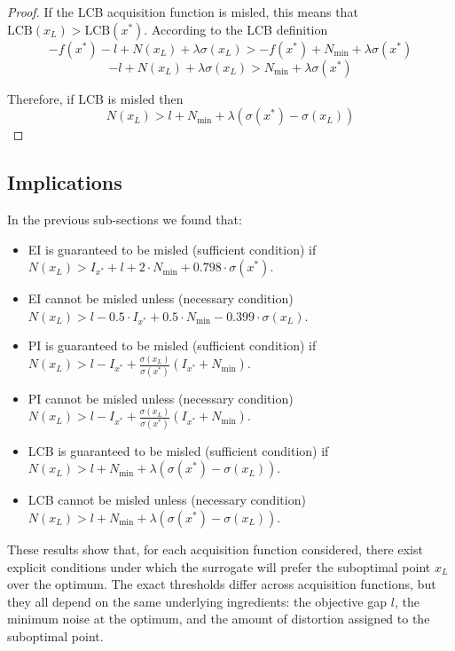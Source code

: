 {\begin{theorem}
\end{theorem}

\begin{proof}
If the LCB acquisition function is misled, this means that $\mathrm{LCB}(x_L) > \mathrm{LCB}(x^*)$. According to the LCB definition
\begin{equation*}
    - f(x^*) - l + N(x_L) + \lambda \sigma(x_L) > - f(x^*) + N_{\min} + \lambda \sigma(x^*)
\end{equation*}
\begin{equation*}
   - l + N(x_L) + \lambda \sigma(x_L) > N_{\min} + \lambda \sigma(x^*)
\end{equation*}

Therefore, if LCB is misled then
\begin{equation*}
    N(x_L) > l + N_{\min} + \lambda (\sigma(x^*) - \sigma(x_L))
\end{equation*}
\end{proof}

\subsection{Implications}
In the previous sub-sections we found that:
\begin{itemize}
    \item EI is guaranteed to be misled (sufficient condition) if $N(x_L) > I_{x^*} + l + 2 \cdot N_{\min} + 0.798 \cdot \sigma(x^*)$.
    \item EI cannot be misled unless (necessary condition) $N(x_L) > l - 0.5 \cdot I_{x^*} + 0.5 \cdot N_{\min} - 0.399 \cdot \sigma(x_L)$.
    \item PI is guaranteed to be misled (sufficient condition) if $N(x_L) > l - I_{x^*} + \frac{\sigma(x_L)}{\sigma(x^*)} (I_{x^*} + N_{\min})$.
    \item PI cannot be misled unless (necessary condition) $N(x_L) > l - I_{x^*} + \frac{\sigma(x_L)}{\sigma(x^*)} (I_{x^*} + N_{\min})$.
    \item LCB is guaranteed to be misled (sufficient condition) if $N(x_L) > l + N_{\min} + \lambda (\sigma(x^*) - \sigma(x_L))$.
    \item LCB cannot be misled unless (necessary condition) $N(x_L) > l + N_{\min} + \lambda (\sigma(x^*) - \sigma(x_L))$.
\end{itemize}

These results show that, for each acquisition function considered, there exist explicit conditions under which the surrogate will prefer the suboptimal point $x_L$ over the optimum. The exact thresholds differ across acquisition functions, but they all depend on the same underlying ingredients: the objective gap $l$, the minimum noise at the optimum, and the amount of distortion assigned to the suboptimal point.

}
